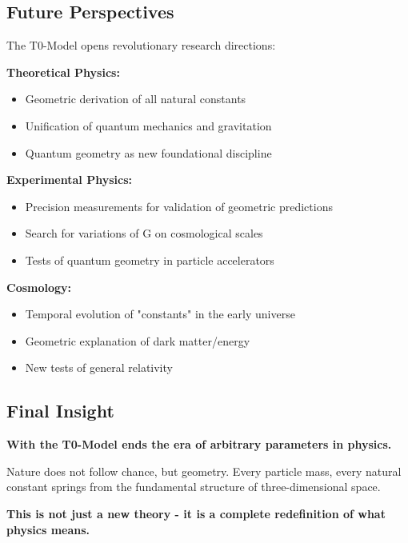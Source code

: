 \documentclass[12pt,a4paper]{article}
\begin{document}
	\subsection{Future Perspectives}
	
	The T0-Model opens revolutionary research directions:
	
	\textbf{Theoretical Physics:}
	\begin{itemize}
		\item Geometric derivation of all natural constants
		\item Unification of quantum mechanics and gravitation
		\item Quantum geometry as new foundational discipline
	\end{itemize}
	
	\textbf{Experimental Physics:}
	\begin{itemize}
		\item Precision measurements for validation of geometric predictions
		\item Search for variations of G on cosmological scales
		\item Tests of quantum geometry in particle accelerators
	\end{itemize}
	
	\textbf{Cosmology:}
	\begin{itemize}
		\item Temporal evolution of "constants" in the early universe
		\item Geometric explanation of dark matter/energy
		\item New tests of general relativity
	\end{itemize}
	
	\subsection{Final Insight}
	
	\begin{tcolorbox}[colback=orange!5!white,colframe=orange!75!black,title=The End of Arbitrariness]
		\textbf{With the T0-Model ends the era of arbitrary parameters in physics.}
		
		Nature does not follow chance, but geometry. Every particle mass, every natural constant springs from the fundamental structure of three-dimensional space.
		
		\textbf{This is not just a new theory - it is a complete redefinition of what physics means.}
	\end{tcolorbox}
	
\end{document}
